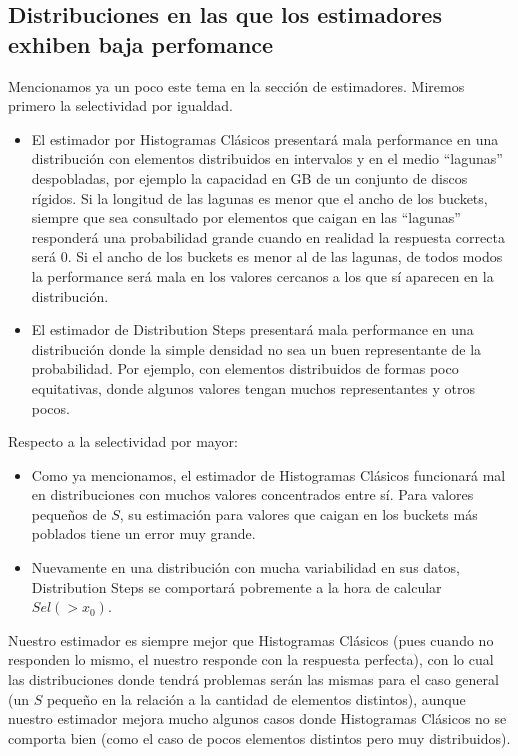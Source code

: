 \subsection{Distribuciones en las que los estimadores exhiben baja perfomance}
Mencionamos ya un poco este tema en la sección de estimadores. Miremos primero la selectividad por igualdad.
\begin{itemize}
 \item El estimador por Histogramas Clásicos presentará mala performance en una distribución con elementos distribuidos en intervalos y en el medio ``lagunas'' despobladas, por ejemplo la capacidad en GB de un conjunto de discos rígidos. Si la longitud de las lagunas es menor que el ancho de los buckets, siempre que sea consultado por elementos que caigan en las ``lagunas'' responderá una probabilidad grande cuando en realidad la respuesta correcta será 0. Si el ancho de los buckets es menor al de las lagunas, de todos modos la performance será mala en los valores cercanos a los que sí aparecen en la distribución.
 \item El estimador de Distribution Steps presentará mala performance en una distribución donde la simple densidad no sea un buen representante de la probabilidad. Por ejemplo, con elementos distribuidos de formas poco equitativas, donde algunos valores tengan muchos representantes y otros pocos.
\end{itemize}
Respecto a la selectividad por mayor:
\begin{itemize}
 \item Como ya mencionamos, el estimador de Histogramas Clásicos funcionará mal en distribuciones con muchos valores concentrados entre sí. Para valores pequeños de $S$, su estimación para valores que caigan en los buckets más poblados tiene un error muy grande.
 \item Nuevamente en una distribución con mucha variabilidad en sus datos, Distribution Steps se comportará pobremente a la hora de calcular $Sel(>x_0)$.
\end{itemize}

Nuestro estimador es siempre mejor que Histogramas Clásicos (pues cuando no responden lo mismo, el nuestro responde con la respuesta perfecta), con lo cual las distribuciones donde tendrá problemas serán las mismas para el caso general (un $S$ pequeño en la relación a la cantidad de elementos distintos), aunque nuestro estimador mejora mucho algunos casos donde Histogramas Clásicos no se comporta bien (como el caso de pocos elementos distintos pero muy distribuidos).